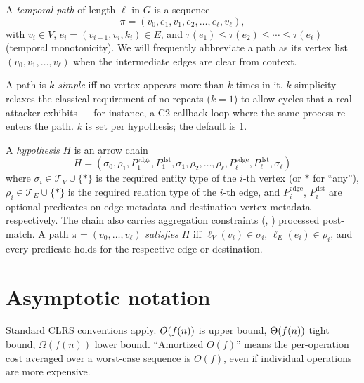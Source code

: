 \begin{definition}
A \emph{temporal path} of length $\ell$ in $G$ is a sequence
\[
    \pi = (v_0, e_1, v_1, e_2, \ldots, e_\ell, v_\ell),
\]
with $v_i \in V$, $e_i = (v_{i-1}, v_i, k_i) \in E$, and
$\tau(e_1) \leq \tau(e_2) \leq \cdots \leq \tau(e_\ell)$ (temporal
monotonicity). We will frequently abbreviate a path as its vertex
list $(v_0, v_1, \ldots, v_\ell)$ when the intermediate edges are
clear from context.
\end{definition}

\begin{definition}
A path is \emph{$k$-simple} iff no vertex appears more than $k$
times in it. $k$-simplicity relaxes the classical requirement of
no-repeats ($k=1$) to allow cycles that a real attacker exhibits
--- for instance, a C2 callback loop where the same process re-enters
the path. $k$ is set per hypothesis; the default is 1.
\end{definition}

\begin{definition}[Hypothesis]
A \emph{hypothesis} $H$ is an arrow chain
\[
    H = (\sigma_0, \rho_1, P_1^{\text{edge}}, P_1^{\text{dst}},
        \sigma_1, \rho_2, \ldots, \rho_\ell, P_\ell^{\text{edge}},
        P_\ell^{\text{dst}}, \sigma_\ell)
\]
where $\sigma_i \in \mathcal{T}_V \cup \{\ast\}$ is the required
entity type of the $i$-th vertex (or $\ast$ for ``any''),
$\rho_i \in \mathcal{T}_E \cup \{\ast\}$ is the required relation
type of the $i$-th edge, and $P_i^{\text{edge}}$, $P_i^{\text{dst}}$
are optional predicates on edge metadata and destination-vertex
metadata respectively.  The chain also carries aggregation
constraints (, ) processed
post-match. A path $\pi = (v_0, \ldots, v_\ell)$ \emph{satisfies}
$H$ iff $\ell_V(v_i) \in \sigma_i$, $\ell_E(e_i) \in \rho_i$, and
every predicate holds for the respective edge or destination.
\end{definition}

\section{Asymptotic notation}

Standard CLRS conventions apply. $O(f(n))$ is upper bound, $\Theta(f(n))$
tight bound, $\Omega(f(n))$ lower bound. ``Amortized $O(f)$'' means
the per-operation cost averaged over a worst-case sequence is
$O(f)$, even if individual operations are more expensive.

